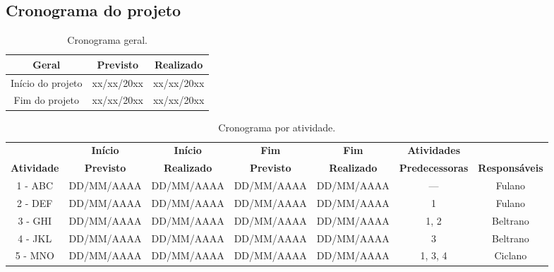 \begin{landscape}

\chapter{Cronograma do projeto}

\begin{table}[htpb]
\begin{center}
\caption{Cronograma geral.}
\begin{tabular}{|c|c|c|}
\hline
\textbf{Geral}          & \textbf{Previsto} & \textbf{Realizado} \\ \hline
Início do projeto       & xx/xx/20xx        & xx/xx/20xx         \\ \hline
Fim do projeto          & xx/xx/20xx        & xx/xx/20xx         \\ \hline
\end{tabular}
\end{center}
\end{table}

\begin{table}[htpb]
\begin{center}
\caption{Cronograma por atividade.}
\begin{tabular}{|c|c|c|c|c|c|c|}
\hline
& \textbf{Início} & \textbf{Início} & \textbf{Fim} & \textbf{Fim} & \textbf{Atividades} & \\
\textbf{Atividade} & \textbf{Previsto} & \textbf{Realizado} & \textbf{Previsto} & \textbf{Realizado} & \textbf{Predecessoras} & \textbf{Responsáveis}\\ \hline
1 - ABC                       & DD/MM/AAAA               & DD/MM/AAAA                & DD/MM/AAAA               & DD/MM/AAAA                & ---                               & Fulano \\ \hline
2 - DEF                       & DD/MM/AAAA               & DD/MM/AAAA                & DD/MM/AAAA               & DD/MM/AAAA                & 1                                 & Fulano \\ \hline
3 - GHI                       & DD/MM/AAAA               & DD/MM/AAAA                & DD/MM/AAAA               & DD/MM/AAAA                & 1, 2                              & Beltrano \\ \hline
4 - JKL                       & DD/MM/AAAA               & DD/MM/AAAA                & DD/MM/AAAA               & DD/MM/AAAA                & 3                                 & Beltrano \\ \hline
5 - MNO                       & DD/MM/AAAA               & DD/MM/AAAA                & DD/MM/AAAA               & DD/MM/AAAA                & 1, 3, 4                           & Ciclano \\ \hline
\end{tabular}
\end{center}
\end{table}




\end{landscape}
